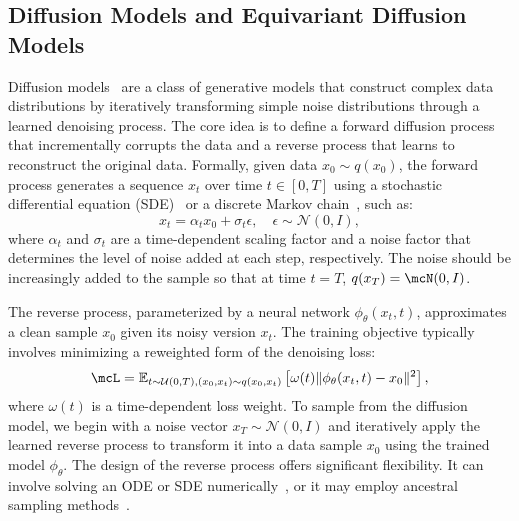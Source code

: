 
\subsection{Diffusion Models and Equivariant Diffusion Models}

Diffusion models~ are a class of generative models that construct complex data distributions by iteratively transforming simple noise distributions through a learned denoising process. The core idea is to define a forward diffusion process that incrementally corrupts the data and a reverse process that learns to reconstruct the original data. Formally, given data \( x_0 \sim q(x_0) \), the forward process generates a sequence \( x_t \) over time \( t \in [0, T] \) using a stochastic differential equation (SDE)~ or a discrete Markov chain~, such as:
\[
x_t = {\alpha_t} x_0 + \sigma_t \epsilon, \quad \epsilon \sim \mathcal{N}(0, I),
\]
where \( \alpha_t \) and \( \sigma_t \) are a time-dependent scaling factor and a noise factor that determines the level of noise added at each step, respectively. The noise should be increasingly added to the sample so that at time $t = T$, $q(x_T) = \mcN(0, I)$.

The reverse process, parameterized by a neural network \( \phi_\theta(x_t, t) \), approximates a clean sample \( x_0 \) given its noisy version \( x_t \). The training objective typically involves minimizing a reweighted form of the denoising loss:
\begin{equation}
    \mcL = \mathbb{E}_{t \sim \mathcal{U}(0, T), (x_0, x_t) \sim q(x_0, x_t)} \left[ \omega(t) \| \phi_\theta (x_t, t) - x_0 \|^2 \right],
    \label{eqn:diff_loss}
\end{equation}
where \(\omega(t)\) is a time-dependent loss weight. To sample from the diffusion model, we begin with a noise vector \( x_T \sim \mathcal{N}(0, I) \) and iteratively apply the learned reverse process to transform it into a data sample \( x_0 \) using the trained model \( \phi_\theta \). The design of the reverse process offers significant flexibility. It can involve solving an ODE or SDE numerically~, or it may employ ancestral sampling methods~. 


